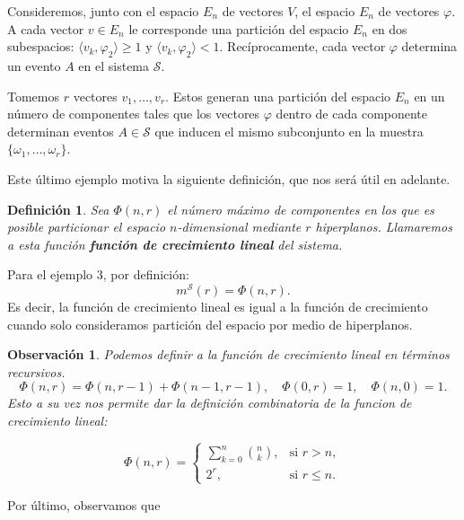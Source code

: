 \documentclass{report}
\newtheorem{dfn}{Definición}[section]
\newtheorem{obs}{Observación}[section]
\begin{document}
Consideremos, junto con el espacio \( E_n \) de vectores \( V \), el espacio \( E_n \) 
de vectores \( \varphi \). A cada vector \( v \in E_n \) le corresponde una partición 
del espacio \( E_n \) en dos subespacios: \(\langle v_k, \varphi_2 \rangle \geq 1\) y \(\langle v_k, \varphi_2 \rangle < 1\). 
Recíprocamente, cada vector \(\varphi\) determina un evento $A$ en el sistema \(\mathcal{S}\).\newline

Tomemos \( r \) vectores \( v_1, \dots, v_r \). Estos generan una partición del espacio \( E_n \) 
en un número de componentes tales que los vectores \( \varphi \) dentro de cada componente determinan eventos 
\( A \in \mathcal{S} \) que inducen el mismo subconjunto en la muestra \( \{\omega_1, \dots, \omega_r \}\).\newline

Este último ejemplo motiva la siguiente definición, que nos será útil en adelante.\newline

\begin{dfn}
    Sea \( \Phi(n, r) \) el número máximo de componentes en los que es posible particionar el espacio \( n \)-dimensional 
mediante \( r \) hiperplanos. Llamaremos a esta función \textbf{función de crecimiento lineal} del sistema.
\end{dfn}


Para el ejemplo 3, por definición:
\[
    m^{\mathcal{S}}(r) = \Phi(n, r).
\]
Es decir, la función de crecimiento lineal es igual a la función de crecimiento cuando solo consideramos partición
del espacio por medio de hiperplanos.

\begin{obs}
Podemos definir a la función de crecimiento lineal en términos recursivos. 
\[
    \Phi(n, r) = \Phi(n, r - 1) + \Phi(n - 1, r - 1),\quad \Phi(0, r) = 1, \quad \Phi(n, 0) = 1.
\]
Esto a su vez nos permite dar la definición combinatoria de la funcion de crecimiento lineal:

\begin{equation}
\Phi(n, r) =
\begin{cases}
\sum\limits_{k=0}^{n} \binom{n}{k}, & \text{si } r > n, \\
2^r, & \text{si } r \leq n.
\end{cases}
\label{def: combinatoria función crecimiento lineal}
\end{equation}
\end{obs}

Por último, observamos que
\end{document}
